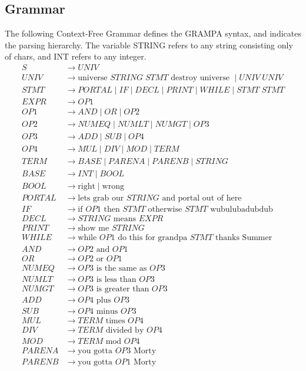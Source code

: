 \documentclass[preprint]{sigplanconf}
\begin{document}
\subsection*{Grammar}
The following Context-Free Grammar defines the GRAMPA syntax, and indicates the parsing hierarchy. The variable STRING refers to any string consisting only of chars, and INT refers to any integer.
\begin{align*}
	S &\rightarrow UNIV \\
	UNIV &\rightarrow \text{universe } STRING \; STMT \text{ destroy universe } \mid UNIV \; UNIV \\
	STMT &\rightarrow PORTAL \mid IF \mid DECL \mid PRINT \mid WHILE \mid STMT \; STMT \\
	EXPR &\rightarrow OP1 \\
	OP1 &\rightarrow AND \mid OR \mid OP2 \\
	OP2 &\rightarrow NUMEQ \mid NUMLT \mid NUMGT \mid OP3 \\
	OP3 &\rightarrow ADD \mid SUB \mid OP4 \\
	OP4 &\rightarrow MUL \mid DIV \mid MOD \mid TERM \\
	TERM &\rightarrow BASE \mid PARENA \mid PARENB \mid STRING \\
	BASE &\rightarrow INT \mid BOOL \\
	BOOL &\rightarrow \text{right} \mid \text{wrong} \\
	PORTAL &\rightarrow \text{lets grab our } STRING \text{ and portal out of here}\\
	IF &\rightarrow \text{if } OP1 \text{ then } STMT \text{ otherwise } STMT \text{ wubulubadubdub}\\
	DECL &\rightarrow STRING \text{ means } EXPR\\
	PRINT &\rightarrow \text{show me } STRING\\
	WHILE &\rightarrow \text{while } OP1 \text{ do this for grandpa } STMT \text{ thanks Summer}\\
	AND &\rightarrow OP2 \text{ and } OP1\\
	OR &\rightarrow OP2 \text{ or } OP1\\
	NUMEQ &\rightarrow OP3 \text{ is the same as } OP3 \\
	NUMLT &\rightarrow OP3 \text{ is less than } OP3\\
	NUMGT &\rightarrow OP3 \text{ is greater than } OP3\\
	ADD &\rightarrow OP4 \text{ plus } OP3\\
	SUB &\rightarrow OP4 \text{ minus } OP3\\
	MUL &\rightarrow TERM \text{ times } OP4\\
	DIV &\rightarrow TERM \text{ divided by } OP4\\
	MOD &\rightarrow TERM \text{ mod } OP4\\
	PARENA &\rightarrow \text{you gotta } OP3 \text{ Morty}\\
	PARENB &\rightarrow \text{you gotta } OP1 \text{ Morty}\\
\end{align*}
\end{document}
